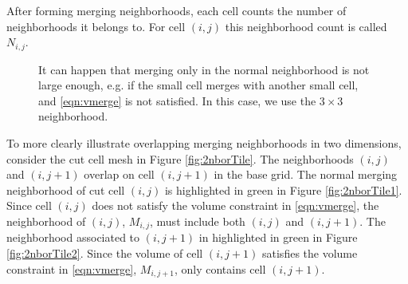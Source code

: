 After forming merging neighborhoods, each cell counts the number of neighborhoods it belongs to.
For cell $(i,j)$ this neighborhood count is called $N_{i,j}$.

\begin{figure}[h]
\hspace*{.5in}
	\hfill
	\caption{\sf It can happen that merging only in the normal neighborhood is not 
        large enough, e.g. if the small cell merges with another small cell, and \eqref{eqn:vmerge} is not satisfied.  In this case, we use the $3\times 3$ neighborhood. }
\end{figure}


To more clearly illustrate overlapping merging neighborhoods in two dimensions, consider the cut cell 
mesh in Figure \ref{fig:2nborTile}.   The neighborhoods $(i,j)$ and $(i,j+1)$ overlap on cell $(i,j+1)$ in 
the base grid.  The normal merging neighborhood of cut cell $(i,j)$ is highlighted in green in Figure \ref{fig:2nborTile1}.  
Since cell $(i,j)$ does not satisfy the volume constraint in \eqref{eqn:vmerge},
the neighborhood of $(i,j)$, $M_{i,j}$, must include both $(i,j)$ and $(i,j+1)$.  
The neighborhood associated to $(i,j+1)$ in highlighted in green in Figure \ref{fig:2nborTile2}.  
Since the volume of cell $(i,j+1)$ satisfies the volume constraint in \eqref{eqn:vmerge}, $M_{i,j+1}$, only contains cell $(i,j+1)$.
  
